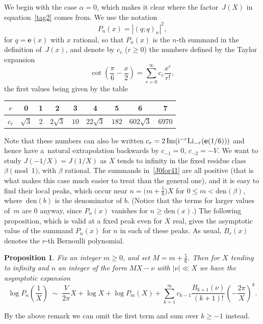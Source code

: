 \documentclass[pdftex]{sigma}
\numberwithin{equation}{section}
\newtheorem{Proposition}[Theorem]{Proposition}
\def\e{\mathbf{e}}
\def\a{\alpha}
\def\m{ - }
\def\si{\;\sim\;}
\def\e{\mathbf{e}}
\def\a{\alpha}
\def\b{\beta}
\def\L{\text{{\rm Li}}}
\def\den{\mathrm{den}}
\def\J{\mathbf J} \def\J{J} %
\begin{document}
We begin with the case $\a=0$, which makes it clear where the
factor~$\J(X)$ in equation~\eqref{tag2} comes from. We use the notation
\[
P_n(x)=|(q;q)_n|^2 ,
\]
for $q=\e(x)$ with $x$ rational, so that $P_n(x)$ is the $n$-th summand in the
definition of~$\J(x)$, and denote by $c_r$ ($r\ge0$) the numbers defined by the
Taylor expansion
\[
\cot\left(\frac\pi6\m\frac x2\right) = \sum_{r=0}^\infty c_r \frac{x^r}{r!} ,
\]
the first values being given by the table
\begin{center} \def\arraystretch{1.2}
\begin{tabular}{|c|cccccccc|}\hline $r$ & 0 & 1 & 2 & 3 & 4 & 5 & 6 & 7 \\ \hline
 $c_r$ & $\sqrt3$ & 2 & $2\sqrt3$ & $10$ & $22\sqrt3$ & $182$ & $602\sqrt3$ & $6970$
 \\ \hline
\end{tabular}
\end{center}
Note that these numbers can also be written $c_r=2 \operatorname{Im}({\rm i}^{-r}\L_{-r}(\e(1/6)))$
and hence have a~natural extrapolation backwards by $c_{-1}=0$, $c_{-2}=-V$.
We want to study $\J(-1/X)=J(1/X)$ as $X$ tends to infinity in the fixed
residue class~$\b\pmod1$, with $\b$ rational. The summands in~\eqref{J0for41}
are all positive (that is what makes this case much easier to treat than the
general one), and it is easy to find their local peaks, which occur
near $n=\big(m+\frac56\big)X$ for $0\le m<\den(\b)$, where~$\den(b)$ is the denominator
of $b$. (Notice that the terms for larger values of~$m$ are 0 anyway, since
$P_n(x)$ vanishes for $n\ge\den(x)$.) The following proposition, which is valid at
a fixed peak even for $X$ real, gives the asymptotic value of the summand $P_n(x)$
for $n$ in each of these peaks. As usual, $B_r(x)$ denotes the $r$-th Bernoulli
polynomial.

\begin{Proposition}
\label{prop.a1}
Fix an integer $m\ge0$, and set $M=m+\frac56$. Then for $X$ tending to infinity
and $n$ an integer of the form $MX-\nu$ with $|\nu|\ll X$ we have the asymptotic
expansion
\begin{equation}
\label{tag3}
\log P_n\left(\frac1X\right) \si \frac V{2\pi} X + \log X + \log P_m(X)
+ \sum_{k=1}^\infty c_{k-1} \frac{B_{k+1}(\nu)}{(k+1)!} \left(-\frac{2\pi}X\right)^k .
\end{equation}
\end{Proposition}



 By the above remark we can omit the first term and sum over
$k\ge-1$ instead.
\end{document}
